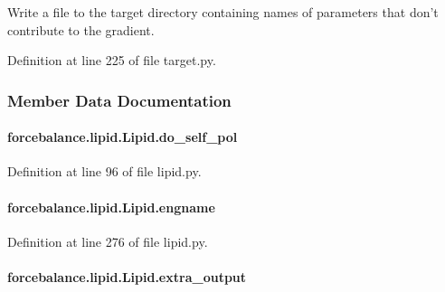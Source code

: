 Write a file to the target directory containing names of parameters that don't contribute to the gradient. 



Definition at line 225 of file target.\-py.



\subsubsection{Member Data Documentation}
\hypertarget{classforcebalance_1_1lipid_1_1Lipid_a20b017fb691f904bd18bd7d9ff1c91fc}{
\paragraph[{do\-\_\-self\-\_\-pol}]{\setlength{\rightskip}{0pt plus 5cm}forcebalance.\-lipid.\-Lipid.\-do\-\_\-self\-\_\-pol}}\label{classforcebalance_1_1lipid_1_1Lipid_a20b017fb691f904bd18bd7d9ff1c91fc}


Definition at line 96 of file lipid.\-py.

\hypertarget{classforcebalance_1_1lipid_1_1Lipid_a067ed652bb763a59b9fe86359d672cab}{
\paragraph[{engname}]{\setlength{\rightskip}{0pt plus 5cm}forcebalance.\-lipid.\-Lipid.\-engname}}\label{classforcebalance_1_1lipid_1_1Lipid_a067ed652bb763a59b9fe86359d672cab}


Definition at line 276 of file lipid.\-py.

\hypertarget{classforcebalance_1_1lipid_1_1Lipid_aedfd8a447f46dc6c2072ad50f4537cf7}{
\paragraph[{extra\-\_\-output}]{\setlength{\rightskip}{0pt plus 5cm}forcebalance.\-lipid.\-Lipid.\-extra\-\_\-output}}\label{classforcebalance_1_1lipid_1_1Lipid_aedfd8a447f46dc6c2072ad50f4537cf7}


